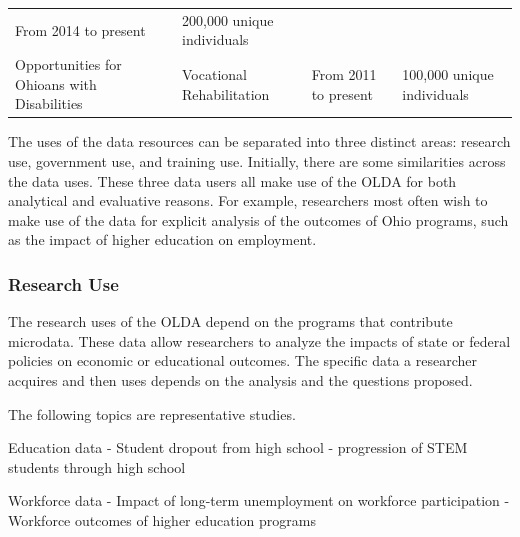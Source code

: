 \documentclass[
]{book}
\begin{document}
\begin{longtable}[]{@{}llll@{}}
\begin{minipage}[t]{0.18\columnwidth}
From 2014 to
present\strut
\end{minipage} & \begin{minipage}[t]{0.18\columnwidth}\raggedright
200,000
unique
individuals\strut
\end{minipage}\tabularnewline
\begin{minipage}[t]{0.19\columnwidth}\raggedright
Opportunities
for
Ohioans
with
Disabilities\strut
\end{minipage} & \begin{minipage}[t]{0.34\columnwidth}\raggedright
Vocational Rehabilitation\strut
\end{minipage} & \begin{minipage}[t]{0.18\columnwidth}\raggedright
From 2011 to
present\strut
\end{minipage} & \begin{minipage}[t]{0.18\columnwidth}\raggedright
100,000
unique
individuals\strut
\end{minipage}\tabularnewline
\bottomrule
\end{longtable}

The uses of the data resources can be separated into three distinct areas: research use, government use, and training use. Initially, there are some similarities across the data uses. These three data users all make use of the OLDA for both analytical and evaluative reasons. For example, researchers most often wish to make use of the data for explicit analysis of the outcomes of Ohio programs, such as the impact of higher education on employment.

\hypertarget{research-use}{%
\subsubsection*{Research Use}\label{research-use}}

The research uses of the OLDA depend on the programs that contribute microdata. These data allow researchers to analyze the impacts of state or federal policies on economic or educational outcomes. The specific data a researcher acquires and then uses depends on the analysis and the questions proposed.

The following topics are representative studies.

Education data
- Student dropout from high school
- progression of STEM students through high school

Workforce data
- Impact of long-term unemployment on workforce participation
- Workforce outcomes of higher education programs
\end{document}

